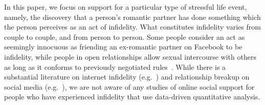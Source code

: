 In this paper, we focus on support for a particular type of stressful life event, namely, the discovery that a person's romantic partner has done something which the person perceives as an act of infidelity.
What constitutes infidelity varies from couple to couple, and from person to person.  Some people consider an act as seemingly innocuous as friending an ex-romantic partner on Facebook to be infidelity, while people in open relationships allow sexual intercourse with others as long as it conforms to previously negotiated rules~\cite{cravens2014clinical,blow2005infidelity,helsper2010netiquette}. While there is a substantial literature on internet infidelity (e.g.~\cite{Jain2018,sahni_myths_2018}) and relationship breakup on social media (e.g.~\cite{garimella2014love,herron_digital_2016,lukacs_romantic_2015,fox_romantic_2015}), we are not aware of any studies of online social support for people who have experienced infidelity that use data-driven quantitative analysis. 



